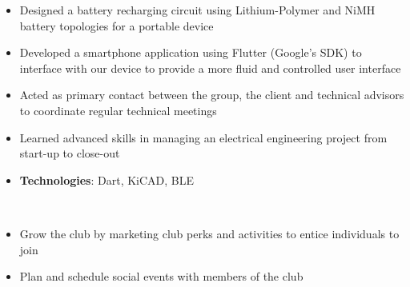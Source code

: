 \documentclass[10pt, letterpaper, ragged2e, withhyper]{altacv}
\begin{document}
\begin{paracol}{2}
            
    
    \begin{itemize}
        \item Designed a battery recharging circuit using Lithium-Polymer and NiMH battery topologies for a portable device 
        \item Developed a smartphone application using Flutter (Google's SDK) to interface with our device to provide a more fluid and 
        controlled user interface
        \item Acted as primary contact between the group, the client and technical advisors to coordinate regular technical meetings 
        \item Learned advanced skills in managing an electrical engineering project from start-up to close-out
        \item \textbf{Technologies}: Dart, KiCAD, BLE
    \end{itemize}

\switchcolumn

     \\







    \begin{itemize}
        \item Grow the club by marketing club perks and activities to entice individuals to join
        \item Plan and schedule social events with members of the club
    \end{itemize}


\end{paracol}
\end{document}
